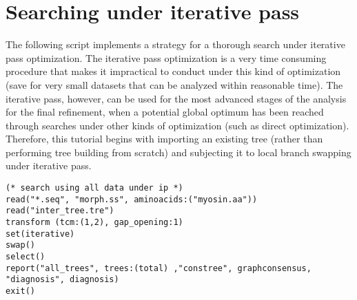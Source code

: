 \section{Searching under iterative pass}{\label{tutorial2}}
The following script implements a strategy for a thorough search under iterative pass optimization. The iterative pass optimization is a very time consuming procedure that makes it impractical to conduct under this kind of optimization (save for very small datasets that can be analyzed within reasonable time). The iterative pass, however, can be used for the most advanced stages of the analysis for the final refinement, when a potential global optimum has been reached through searches under other kinds of optimization (such as direct optimization). Therefore, this tutorial begins with importing an existing tree (rather than performing tree building from scratch) and subjecting it to local branch swapping under iterative pass.

\begin{verbatim}
(* search using all data under ip *)
read("*.seq", "morph.ss", aminoacids:("myosin.aa"))
read("inter_tree.tre")
transform (tcm:(1,2), gap_opening:1)
set(iterative)
swap()
select()
report("all_trees", trees:(total) ,"constree", graphconsensus,
"diagnosis", diagnosis)
exit()
\end{verbatim}


